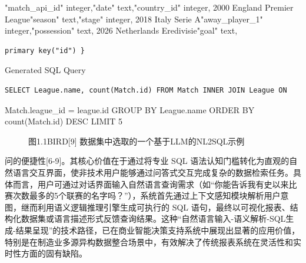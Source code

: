 \documentclass[12pt,a4paper,openright,UTF8]{ctexbook}
\begin{document}
"match\_api\_id" integer,"date" text,"country\_id" integer, 2000 England Premier League"season" text,"stage" integer, 2018 Italy Serie A"away\_player\_1" integer,"possession" text, 2026 Netherlands Eredivisie"goal" text,

\begin{lstlisting}
primary key("id") }
\end{lstlisting}

Generated SQL Query

\begin{lstlisting}
SELECT League.name, count(Match.id) FROM Match INNER JOIN League ON
\end{lstlisting}

Match.league\_id = league.id GROUP BY League.name ORDER BY count(Match.id) DESC LIMIT 5

\begin{figure}[htbp]
\centering
{}
\caption{图1.1BIRD[9] 数据集中选取的一个基于LLM的NL2SQL示例}
\end{figure}

问的便捷性[6-9]。其核心价值在于通过将专业 SQL 语法认知门槛转化为直观的自然语言交互界面，使非技术用户能够通过问答式交互完成复杂的数据检索任务。具体而言，用户可通过对话界面输入自然语言查询需求（如“你能告诉我有史以来比赛次数最多的5个联赛的名字吗？”），系统首先通过上下文感知模块解析用户意图，继而利用语义逻辑推理引擎生成可执行的 SQL 语句，最终以可视化报表、结构化数据集或语言描述形式反馈查询结果。这种“自然语言输入-语义解析-SQL生成-结果呈现”的技术路径，已在商业智能决策支持系统中展现出显著的应用价值，特别是在制造业多源异构数据整合场景中，有效解决了传统报表系统在灵活性和实时性方面的固有缺陷。
\end{document}
